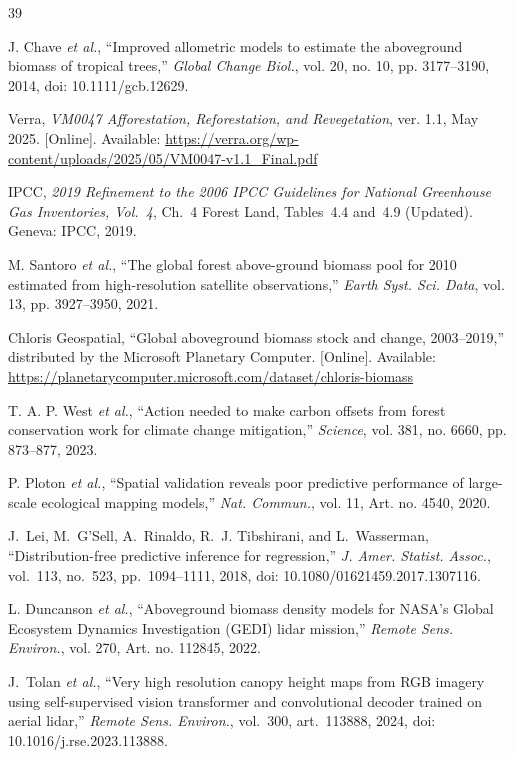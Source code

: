 \documentclass[conference,a4paper]{IEEEtran}
\begin{document}
\begin{thebibliography}{39}

J. Chave \textit{et al.}, ``Improved allometric models to estimate the aboveground biomass of tropical trees,'' \textit{Global Change Biol.}, vol. 20, no. 10, pp. 3177--3190, 2014, doi: 10.1111/gcb.12629.

Verra, \textit{VM0047 Afforestation, Reforestation, and Revegetation}, ver. 1.1, May 2025. [Online]. Available: \url{https://verra.org/wp-content/uploads/2025/05/VM0047-v1.1_Final.pdf}

IPCC, \textit{2019 Refinement to the 2006 IPCC Guidelines for National Greenhouse Gas Inventories, Vol.~4}, Ch.~4 Forest Land, Tables~4.4 and~4.9 (Updated). Geneva: IPCC, 2019.

M. Santoro \textit{et al.}, ``The global forest above-ground biomass pool for 2010 estimated from high-resolution satellite observations,'' \textit{Earth Syst. Sci. Data}, vol. 13, pp. 3927--3950, 2021.

Chloris Geospatial, ``Global aboveground biomass stock and change, 2003--2019,'' distributed by the Microsoft Planetary Computer. [Online]. Available: \url{https://planetarycomputer.microsoft.com/dataset/chloris-biomass}

T. A. P. West \textit{et al.}, ``Action needed to make carbon offsets from forest conservation work for climate change mitigation,'' \textit{Science}, vol. 381, no. 6660, pp. 873--877, 2023.

P. Ploton \textit{et al.}, ``Spatial validation reveals poor predictive performance of large-scale ecological mapping models,'' \textit{Nat. Commun.}, vol. 11, Art. no. 4540, 2020.

J.~Lei, M.~G'Sell, A.~Rinaldo, R.~J. Tibshirani, and L.~Wasserman, ``Distribution-free predictive inference for regression,'' \textit{J. Amer. Statist. Assoc.}, vol.~113, no.~523, pp.~1094--1111, 2018, doi: 10.1080/01621459.2017.1307116.

L. Duncanson \textit{et al.}, ``Aboveground biomass density models for NASA's Global Ecosystem Dynamics Investigation (GEDI) lidar mission,'' \textit{Remote Sens. Environ.}, vol. 270, Art. no. 112845, 2022.

J.~Tolan \textit{et al.}, ``Very high resolution canopy height maps from RGB imagery using self-supervised vision transformer and convolutional decoder trained on aerial lidar,'' \textit{Remote Sens. Environ.}, vol.~300, art.~113888, 2024, doi: 10.1016/j.rse.2023.113888.


\end{thebibliography}
\end{document}
